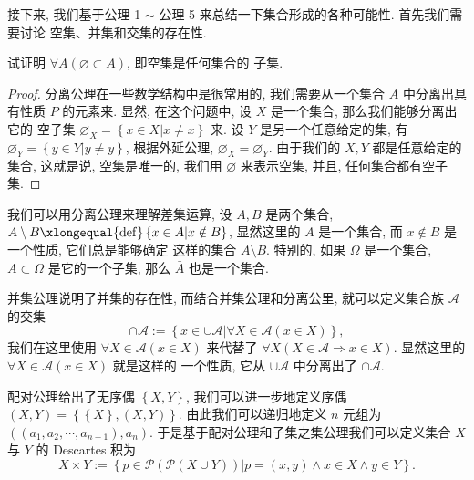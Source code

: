 \documentclass[10pt,UTF8]{book} %
\begin{document}
接下来, 我们基于公理 1 $\sim$ 公理 5 来总结一下集合形成的各种可能性. 首先我们需要讨论
空集、并集和交集的存在性.

\begin{example}
    试证明 {\kaishu $\forall A \left( \varnothing \subset A \right)$, 即空集是任何集合的
    子集}.
    \begin{proof}
        分离公理在一些数学结构中是很常用的, 我们需要从一个集合 $A$ 中分离出具有性质
        $P$ 的元素来. 显然, 在这个问题中, 设 $X$ 是一个集合, 那么我们能够分离出它的
        空子集 $\varnothing_X = \left\{ x \in X | x \ne x \right\}$ 来.
        设 $Y$ 是另一个任意给定的集, 有 $\varnothing_Y = \left\{ y \in Y |
        y \ne y \right\}$, 根据外延公理, $\varnothing_X = \varnothing_Y$.
        由于我们的 $X,Y$ 都是任意给定的集合, 这就是说, 空集是唯一的, 我们用 $\varnothing$
        来表示空集, 并且, 任何集合都有空子集.
    \end{proof}
\end{example}
\begin{example}
    我们可以用分离公理来理解差集运算, 设 $A,B$ 是两个集合, $A \setminus B
    \xlongequal{\mathrm{def}} \left\{ x \in A | x \notin B \right\}$,
    显然这里的 $A$ 是一个集合, 而 $x \notin B$ 是一个性质, 它们总是能够确定
    这样的集合 $A \setminus B$. 特别的, 如果 $\varOmega$ 是一个集合, $A \subset \varOmega$
    是它的一个子集, 那么 $\bar A$ 也是一个集合.
\end{example}
\begin{example}
    并集公理说明了并集的存在性, 而结合并集公理和分离公里, 就可以定义集合族 $\mathscr{A}$ 的交集
    \[ \cap \mathscr{A} := \left\{
        x \in \cup \mathscr{A} | \forall X \in \mathscr{A} \left( x \in X \right)
    \right\}, \]
    我们在这里使用 $\forall X \in \mathscr{A}(x \in X)$ 来代替了 $\forall X \left( X \in \mathscr{A} \Rightarrow x \in X \right)$.
    显然这里的 $\forall X \in \mathscr{A} \left( x \in X \right)$ 就是这样的
    一个性质, 它从 $\cup\mathscr{A}$ 中分离出了 $\cap\mathscr{A}$.
\end{example}

\begin{example}
    配对公理给出了无序偶 $\left\{ X,Y \right\}$, 我们可以进一步地定义序偶
    $(X,Y) = \left\{ \left\{X\right\}, \left( X,Y \right) \right\}$.
    由此我们可以递归地定义 $n$ 元组为 $\left( (a_1, a_2, \cdots, a_{n-1}), a_n \right)$.
    于是基于配对公理和子集之集公理我们可以定义集合 $X$ 与 $Y$ 的 Descartes 积为
    \[ X \times Y := \left\{p \in \mathcal{P}\left(
        \mathcal{P}\left(
            X \cup Y
        \right)
    \right) | p = (x, y) \wedge x \in X \wedge y \in Y \right\}. \]
\end{example}
\end{document}
